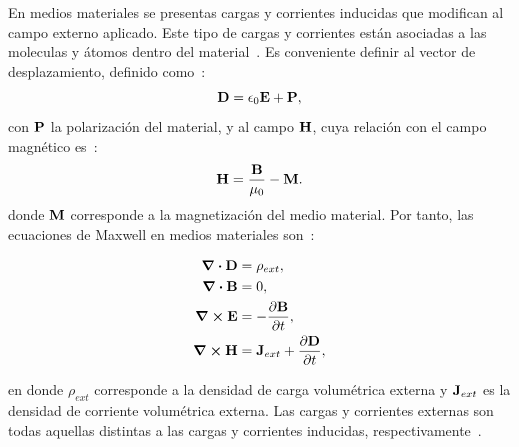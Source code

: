 En medios materiales se presentas cargas y corrientes inducidas que modifican al campo externo aplicado. Este tipo de cargas y corrientes están asociadas a las moleculas y átomos dentro del material~\cite{purcell2011electricity}. Es conveniente definir al vector de desplazamiento, definido como~\cite{jackson1999electrodynamics}:
\begin{equation}
\vb{D} = \epsilon_{0} \vb{E} + \vb{P},
\label{eq:vecDes}
\end{equation}
con $\vb{P}$ la polarización del material, y al campo $\vb{H}$, cuya relación con el campo magnético es~\cite{griffiths2013electrodynamics}:
\begin{equation}
\vb{H} = \frac{\vb{B}}{\mu_{0}}-\vb{M}.
\label{eq:campoH}
\end{equation}
donde $\vb{M}$ corresponde a la magnetización del medio material. Por tanto, las ecuaciones de Maxwell en medios materiales son~\cite{jackson1999electrodynamics}:
\begin{tcolorbox}[title = Ecuaciones de Maxwell en medios materiales]\vspace*{-0.3cm}
	\begin{subequations}
		\begin{align}
		\div \vb{D}& = \rho_{ext},\label{eq:maxwell1_mat}\\
		\div \vb{B}& =0,\\
		\curl \vb{E}& = - \pdv{\vb{B}}{t},\\
		\curl \vb{H} &= \vb{J}_{ext} + \pdv{\vb{D}}{t},
		\label{eq:maxwell4_mat}
		\end{align}
	\end{subequations}
\end{tcolorbox}
\noindent en donde $\rho_{ext}$ corresponde a la densidad de carga volumétrica externa y $\vb{J}_{ext}$ es la densidad de corriente volumétrica externa. Las cargas y corrientes externas son todas aquellas distintas a las cargas y corrientes inducidas, respectivamente~\cite{griffiths2013electrodynamics}.\\

